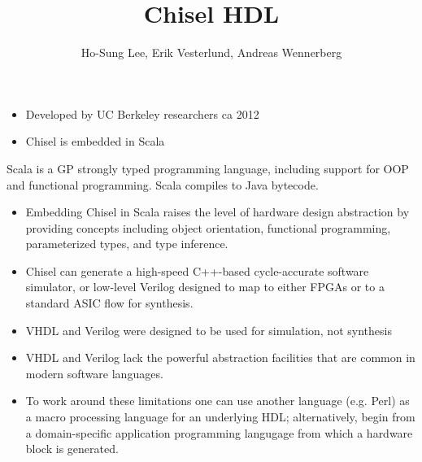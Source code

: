 \documentclass{beamer}
\title{Chisel HDL}
\author{Ho-Sung Lee, Erik Vesterlund, Andreas Wennerberg}
\begin{document}
\begin{frame}
\titlepage
\end{frame}

\begin{frame}
\begin{itemize}

\item Developed by UC Berkeley researchers ca 2012

\item Chisel is embedded in Scala

\end{itemize}
\end{frame}

\begin{frame}

Scala is a GP strongly typed programming language, including support for OOP and functional programming. Scala compiles to Java bytecode.

\end{frame}

\begin{frame}
\begin{itemize}

\item Embedding Chisel in Scala raises the level of hardware design abstraction by providing concepts including object orientation, functional programming, parameterized types, and type inference.

\item Chisel can generate a high-speed C++-based cycle-accurate software simulator, or low-level Verilog designed to map to either FPGAs or to a standard ASIC flow for synthesis.

\end{itemize}
\end{frame}

\begin{frame}
\begin{itemize}

\item VHDL and Verilog were designed to be used for simulation, not synthesis

\item VHDL and Verilog lack the powerful abstraction facilities that are common in modern software languages.

\item To work around these limitations one can use another language (e.g. Perl) as a macro processing language for an underlying HDL; alternatively, begin from a domain-specific application programming langugage from which a hardware block is generated.

\end{itemize}
\end{frame}
\end{document}
